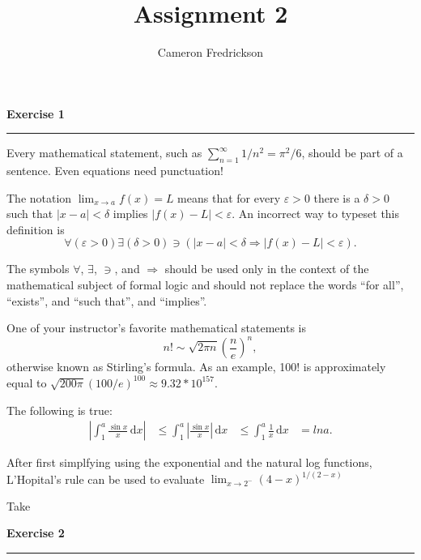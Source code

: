 \documentclass{article}
\title{Assignment 2}
\author{Cameron Fredrickson}
\date{}
\newcommand{\ud}{\, \mathrm{d}}
\begin{document}
\maketitle

\noindent \textbf{Exercise 1}

\noindent \rule{\textwidth}{.1mm}

Every mathematical statement, such as $ \sum_{n=1}^\infty 1/n^2 = \pi^2/6$, should be part of a sentence. Even equations need punctuation!

The notation $ \lim_{x \to a} f(x) = L$ means that for every $ \varepsilon > 0$ there is a $ \delta > 0$ such that $|x-a| < \delta$ implies $|f(x)-L| < \varepsilon$. An incorrect way to typeset this definition is \begin{equation*}
\forall \left( \varepsilon > 0 \right) \exists \left( \delta > 0 \right) \ni \left( |x-a| < \delta \Longrightarrow |f(x)-L| < \varepsilon \right).
\end{equation*}

The symbols $\forall$, $\exists$, $\ni$, and $\Longrightarrow$ should be used only in the context of the mathematical subject of formal logic and should not replace the words ``for all'', ``exists'', and ``such that'', and ``implies''.

One of your instructor's favorite mathematical statements is \begin{equation*}
n! \sim \sqrt{2 \pi n} \left( \frac{n}{e} \right)^{n},
\end{equation*} otherwise known as Stirling's formula. As an example,   100! is approximately equal to $ \sqrt{200 \pi} \left( 100/e \right)^{100} \approx 9.32 * 10^{157}.$

The following is true: \begin{align*}
\left| \int_1^a \frac{\sin{x}}{x} \ud x\right| & \leq \int_1^a \left|\frac{\sin{x}}{x}\right| \ud x
& \leq \int_1^a \frac{1}{x} \ud x
& = ln a.
\end{align*}

After first simplfying using the exponential and the natural log functions, L'Hopital's rule can be used to evaluate $ \lim_{x \to 2^-} (4-x)^{1/(2-x)}$%

Take

\noindent \textbf{Exercise 2}

\noindent \rule{\textwidth}{.1mm}
\end{document}
